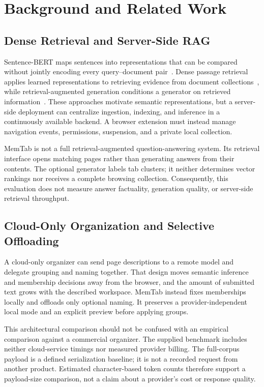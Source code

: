 \documentclass[conference]{IEEEtran}
\begin{document}
\section{Background and Related Work}
\subsection{Dense Retrieval and Server-Side RAG}
Sentence-BERT maps sentences into representations that can be compared without
jointly encoding every query--document pair~\cite{reimers2019sbert}.
Dense passage retrieval applies learned representations to retrieving evidence
from document collections~\cite{karpukhin2020dpr}, while retrieval-augmented
generation conditions a generator on retrieved information~\cite{lewis2020rag}.
These approaches motivate semantic representations, but a server-side
deployment can centralize ingestion, indexing, and inference in a continuously
available backend. A browser extension must instead manage navigation events,
permissions, suspension, and a private local collection.

MemTab is not a full retrieval-augmented question-answering system. Its
retrieval interface opens matching pages rather than generating answers from
their contents. The optional generator labels tab clusters; it neither
determines vector rankings nor receives a complete browsing collection.
Consequently, this evaluation does not measure answer factuality,
generation quality, or server-side retrieval throughput.

\subsection{Cloud-Only Organization and Selective Offloading}
A cloud-only organizer can send page descriptions to a remote model and
delegate grouping and naming together. That design moves semantic inference
and membership decisions away from the browser, and the amount of submitted
text grows with the described workspace. MemTab instead fixes memberships
locally and offloads only optional naming. It preserves a provider-independent
local mode and an explicit preview before applying groups.

This architectural comparison should not be confused with an empirical
comparison against a commercial organizer. The supplied benchmark includes
neither cloud-service timings nor measured provider billing. The full-corpus
payload is a defined serialization baseline; it is not a recorded request
from another product. Estimated character-based token counts therefore support
a payload-size comparison, not a claim about a provider's cost or response
quality.
\end{document}
